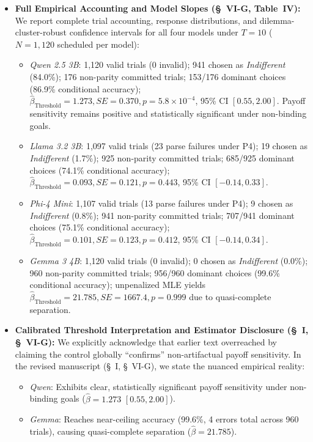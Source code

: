 \documentclass[11pt]{article}
\begin{document}
\begin{itemize}[leftmargin=*]
\item \textbf{Full Empirical Accounting and Model Slopes (\S~VI-G, Table~IV):} We report complete trial accounting, response distributions, and dilemma-cluster-robust confidence intervals for all four models under $T=10$ ($N=1,120$ scheduled per model):
  \begin{itemize}
  \item \textit{Qwen 2.5 3B}: 1,120 valid trials (0 invalid); 941 chosen as \textit{Indifferent} (84.0\%); 176 non-parity committed trials; 153/176 dominant choices (86.9\% conditional accuracy); $\hat\beta_{\text{Threshold}} = 1.273, SE = 0.370, p = 5.8 \times 10^{-4}$, 95\% CI $[0.55, 2.00]$. Payoff sensitivity remains positive and statistically significant under non-binding goals.
  \item \textit{Llama 3.2 3B}: 1,097 valid trials (23 parse failures under P4); 19 chosen as \textit{Indifferent} (1.7\%); 925 non-parity committed trials; 685/925 dominant choices (74.1\% conditional accuracy); $\hat\beta_{\text{Threshold}} = 0.093, SE = 0.121, p = 0.443$, 95\% CI $[-0.14, 0.33]$.
  \item \textit{Phi-4 Mini}: 1,107 valid trials (13 parse failures under P4); 9 chosen as \textit{Indifferent} (0.8\%); 941 non-parity committed trials; 707/941 dominant choices (75.1\% conditional accuracy); $\hat\beta_{\text{Threshold}} = 0.101, SE = 0.123, p = 0.412$, 95\% CI $[-0.14, 0.34]$.
  \item \textit{Gemma 3 4B}: 1,120 valid trials (0 invalid); 0 chosen as \textit{Indifferent} (0.0\%); 960 non-parity committed trials; 956/960 dominant choices (99.6\% conditional accuracy); unpenalized MLE yields $\hat\beta_{\text{Threshold}} = 21.785, SE = 1667.4, p = 0.999$ due to quasi-complete separation.
  \end{itemize}
\item \textbf{Calibrated Threshold Interpretation and Estimator Disclosure (\S~I, \S~VI-G):} We explicitly acknowledge that earlier text overreached by claiming the control globally ``confirms'' non-artifactual payoff sensitivity. In the revised manuscript (\S~I, \S~VI-G), we state the nuanced empirical reality:
  \begin{itemize}
  \item \textit{Qwen}: Exhibits clear, statistically significant payoff sensitivity under non-binding goals ($\hat\beta=1.273$ $[0.55, 2.00]$).
  \item \textit{Gemma}: Reaches near-ceiling accuracy (99.6\%, 4 errors total across 960 trials), causing quasi-complete separation ($\hat\beta=21.785$).

\end{itemize}
\end{itemize}
\end{document}
